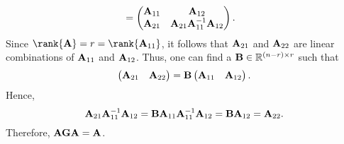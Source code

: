 \begin{Lemma}{}{}
\begin{align*}
         & =\begin{pmatrix}
                \mathbf{A}_{11} & \mathbf{A}_{12}                                    \\
                \mathbf{A}_{21} & \mathbf{A}_{21}\mathbf{A}_{11}^{-1}\mathbf{A}_{12}
            \end{pmatrix}.
    \end{align*}
    Since $ \rank{\Matrix{A}}=r=\rank{\Matrix{A}_{11}} $, it follows that $ \mathbf{A}_{21} $ and $ \mathbf{A}_{22} $
    are linear combinations of $\mathbf{A}_{11}$ and $ \mathbf{A}_{12} $. Thus, one can find a $ \mathbf{B}\in\mathbb{R}^{(n-r)\times r} $
    such that
    \[ \begin{pmatrix}
            \mathbf{A}_{21} & \mathbf{A}_{22}
        \end{pmatrix}=\mathbf{B}\begin{pmatrix}
            \mathbf{A}_{11} & \mathbf{A}_{12}
        \end{pmatrix}. \]
    Hence,
    \[ \mathbf{A}_{21}\mathbf{A}_{11}^{-1}\mathbf{A}_{12}=\mathbf{B}\mathbf{A}_{11}\mathbf{A}_{11}^{-1}\mathbf{A}_{12}=\mathbf{B}\mathbf{A}_{12}=\mathbf{A}_{22}. \]
    Therefore, $ \mathbf{AGA}=\mathbf{A} $.
\end{Lemma}